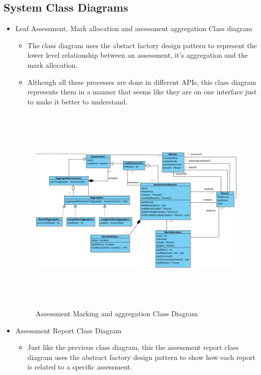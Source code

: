 \documentclass[12pt]{article}
\begin{document}
		\subsection{System Class Diagrams }%
				
				\begin{itemize}
                                        \item Leaf Assessment, Mark allocation and assessment aggregation Class diagram
                                                \begin{itemize}
                                                \item The class diagram uses the abstact factory design pattern to represent the lower level relationship between an assessment, it's aggregation and the mark allocation.
                                                \item Although all these processes are done in different APIs, this class diagram represents them in a manner that seems like they are on one interface just to make it better to understand.
                                                \end{itemize}
                                        \begin{figure}[h]
                                                \centering
                                                \includegraphics[width=6in, height=4in]{Pictures/MiniPhase2ClassDiag.jpg}
                                                \caption{Assessment Marking and aggregation Class Diagram}
					\end{figure}
					\FloatBarrier
                                        \item Assessment Report Class Diagram
						\begin{itemize}
                                                \item Just like the previous class diagram, this the assessment report class diagram uses the abstract factory design pattern to show how each report is related to a specific assessment.


\end{itemize}
\end{itemize}
\end{document}
